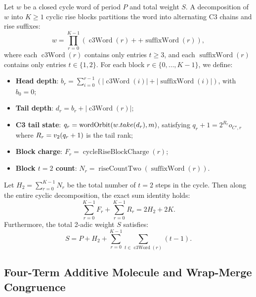 \begin{definition}\label{def:block-decomp}
Let $w$ be a closed cycle word of period $P$ and total weight $S$.  A decomposition of $w$ into $K\ge 1$ cyclic rise blocks partitions the word into alternating C3 chains and rise suffixes:
\begin{equation*}
  w = \prod_{r=0}^{K-1} \left( \operatorname{c3Word}(r) ++ \operatorname{suffixWord}(r) \right),
\end{equation*}
where each $\operatorname{c3Word}(r)$ contains only entries $t\ge 3$, and each $\operatorname{suffixWord}(r)$ contains only entries $t\in\{1,2\}$.
For each block $r\in\{0,\dots,K-1\}$, we define:
\begin{itemize}[leftmargin=*]
  \item \textbf{Head depth}: $b_r = \sum_{i=0}^{r-1} (|\operatorname{c3Word}(i)| + |\operatorname{suffixWord}(i)|)$, with $b_0=0$;
  \item \textbf{Tail depth}: $d_r = b_r + |\operatorname{c3Word}(r)|$;
  \item \textbf{C3 tail state}: $q_r = \mathrm{wordOrbit}(w.take(d_r), m)$, satisfying $q_r + 1 = 2^{R_r} o_{C',r}$ where $R_r = v_2\!\left(q_r+1\right)$ is the tail rank;
  \item \textbf{Block charge}: $F_r = \operatorname{cycleRiseBlockCharge}(r)$;
  \item \textbf{Block $t=2$ count}: $N_r = \operatorname{riseCountTwo}(\operatorname{suffixWord}(r))$.
\end{itemize}
\end{definition}

\begin{theorem}\label{thm:charge-rank-balance}
Let $H_2 = \sum_{r=0}^{K-1} N_r$ be the total number of $t=2$ steps in the cycle.  Then along the entire cyclic decomposition, the exact sum identity holds:
\begin{equation}\label{eq:global-balance}
  \sum_{r=0}^{K-1} F_r + \sum_{r=0}^{K-1} R_r = 2H_2 + 2K.
\end{equation}
Furthermore, the total 2-adic weight $S$ satisfies:
\begin{equation}\label{eq:S-decomposition}
  S = P + H_2 + \sum_{r=0}^{K-1} \sum_{t\in \operatorname{c3Word}(r)} (t - 1).
\end{equation}
\end{theorem}

\subsection{Four-Term Additive Molecule and Wrap-Merge Congruence}

